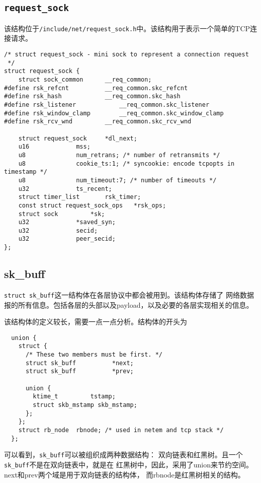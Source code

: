     \subsection{\texttt{request_sock}}

        该结构位于\texttt{/include/net/request_sock.h}中。该结构用于表示一个简单的TCP连接请求。

\begin{verbatim}
/* struct request_sock - mini sock to represent a connection request
 */
struct request_sock {
    struct sock_common      __req_common;
#define rsk_refcnt          __req_common.skc_refcnt
#define rsk_hash            __req_common.skc_hash
#define rsk_listener            __req_common.skc_listener
#define rsk_window_clamp        __req_common.skc_window_clamp
#define rsk_rcv_wnd         __req_common.skc_rcv_wnd

    struct request_sock     *dl_next;
    u16             mss;
    u8              num_retrans; /* number of retransmits */
    u8              cookie_ts:1; /* syncookie: encode tcpopts in timestamp */
    u8              num_timeout:7; /* number of timeouts */
    u32             ts_recent;
    struct timer_list       rsk_timer;
    const struct request_sock_ops   *rsk_ops;
    struct sock         *sk;
    u32             *saved_syn;
    u32             secid;
    u32             peer_secid;
};
\end{verbatim}

    \subsection{sk\_buff}
\label{sec:sk_buff}

\texttt{struct sk_buff}这一结构体在各层协议中都会被用到。该结构体存储了
网络数据报的所有信息。包括各层的头部以及payload，以及必要的各层实现相关的信息。

该结构体的定义较长，需要一点一点分析。结构体的开头为
\begin{verbatim}
  union {
    struct {
      /* These two members must be first. */
      struct sk_buff          *next;
      struct sk_buff          *prev;

      union {
        ktime_t         tstamp;
        struct skb_mstamp skb_mstamp;
      };
    };
    struct rb_node  rbnode; /* used in netem and tcp stack */
  };
\end{verbatim}

可以看到，\texttt{sk_buff}可以被组织成两种数据结构：
双向链表和红黑树。且一个\texttt{sk_buff}不是在双向链表中，就是在
红黑树中，因此，采用了union来节约空间。next和prev两个域是用于双向链表的结构体，
而rbnode是红黑树相关的结构。

